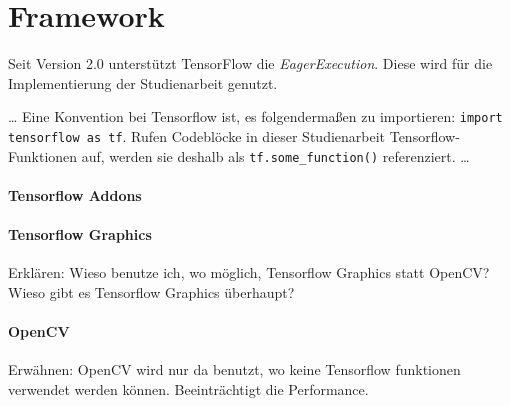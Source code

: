 \section{Framework}

Seit Version 2.0 unterstützt TensorFlow die \emph{EagerExecution}. Diese wird für die Implementierung der Studienarbeit genutzt. \cite{learn-tensorflow}

\dots
Eine Konvention bei Tensorflow ist, es folgendermaßen zu importieren: \texttt{import tensorflow as tf}. Rufen Codeblöcke in dieser Studienarbeit Tensorflow-Funktionen auf, werden sie deshalb als \texttt{tf.some_function()} referenziert.
\dots

\paragraph{Tensorflow Addons}
\paragraph{Tensorflow Graphics}
Erklären: Wieso benutze ich, wo möglich, Tensorflow Graphics statt OpenCV? Wieso gibt es Tensorflow Graphics überhaupt?
\paragraph{OpenCV}
Erwähnen: OpenCV wird nur da benutzt, wo keine Tensorflow funktionen verwendet werden können. Beeinträchtigt die Performance.